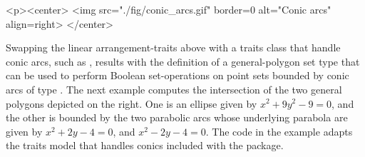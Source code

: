\lcTex{%
  \setlength{\BooleanSetOpsWidthRight}{6cm}
  \setlength{\BooleanSetOpsWidthLeft}{\BooleanSetOpsWidthLineReal}
  \addtolength{\BooleanSetOpsWidthLeft}{-\BooleanSetOpsWidthRight}
  \begin{minipage}{\BooleanSetOpsWidthLeft}
}
\label{fig:conics}
\begin{ccHtmlOnly}
  <p><center>
    <img src="./fig/conic_arcs.gif" border=0 alt="Conic arcs" align=right>
  </center>
\end{ccHtmlOnly}
Swapping the linear arrangement-traits 
above with a traits class that handle conic arcs, such as
, results with the definition of a
general-polygon set type that can be used to perform Boolean 
set-operations on point sets bounded by conic arcs of type
. The next example computes the intersection of the
two general polygons depicted on the right. One is an ellipse
given by $x^2 + 9y^2 - 9 = 0$, and the other is bounded by the two
parabolic arcs whose underlying parabola are given by 
$x^2 + 2y - 4 = 0$, and $x^2 - 2y - 4 = 0$. The code in the example adapts
the traits model that handles conics included with the 
package.


